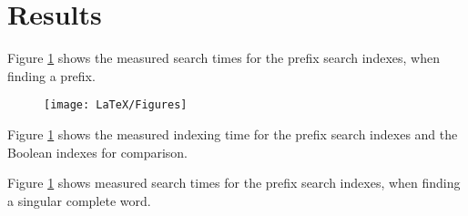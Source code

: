 \section{Results}
Figure \ref{} shows the measured search times for the prefix search indexes, when finding a prefix.

\begin{figure}[ht!]
    \centering
    \texttt{[image: LaTeX/Figures]}
    \caption{}
    \label{fig:SearchtimePrefix}
\end{figure}

Figure \ref{} shows the measured indexing time for the prefix search indexes and the Boolean indexes for comparison.

Figure \ref{} shows measured search times for the prefix search indexes, when finding a singular complete word.
